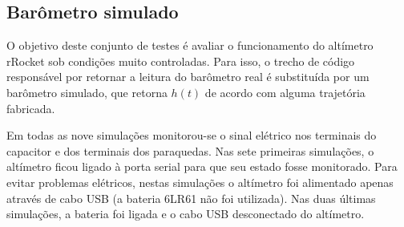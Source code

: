 \documentclass[12pt,a4paper]{article}
\begin{document}
\subsection{Barômetro simulado}
\label{sec:simulations}
O objetivo deste conjunto de testes é avaliar o funcionamento do altímetro rRocket sob condições muito controladas. Para isso, o trecho de código responsável por retornar a leitura do barômetro real é substituída por um barômetro simulado, que retorna $h(t)$ de acordo com alguma trajetória fabricada.

Em todas as nove simulações monitorou-se o sinal elétrico nos terminais do capacitor e dos terminais dos paraquedas. Nas sete primeiras simulações, o altímetro ficou ligado à porta serial para que seu estado fosse monitorado. Para evitar problemas elétricos, nestas simulações o altímetro foi alimentado apenas através de cabo USB (a bateria 6LR61 não foi utilizada). Nas duas últimas simulações, a bateria foi ligada e o cabo USB desconectado do altímetro.
\end{document}

